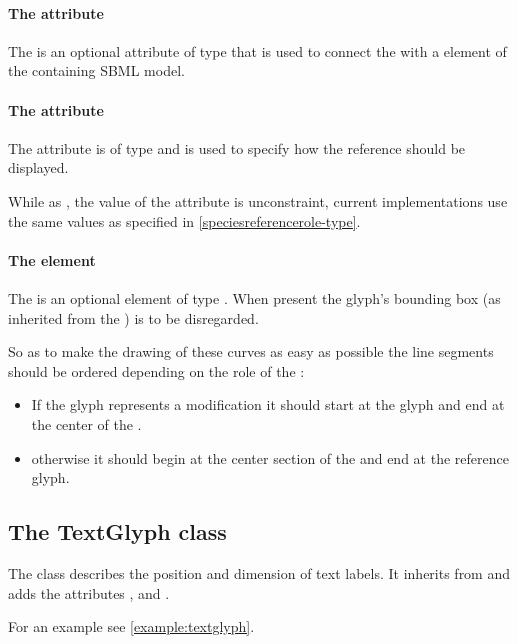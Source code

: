\paragraph{The  attribute}
The  is an optional attribute of type  
that is used to connect the \ReferenceGlyph with a element of the 
containing SBML model. 

\paragraph{The  attribute}
The  attribute is of type  and is used to 
specify how the reference should be displayed. 

While as , the value of the  attribute is 
unconstraint, current implementations use the same values as specified 
in \ref{speciesreferencerole-type}. 


\paragraph{The  element}
The  is an optional element of type \Curve. When present 
the glyph's bounding box (as inherited from the \GraphicalObject) is to 
be disregarded. 

So as to make the drawing of these curves as easy as possible the line 
segments should be ordered depending on the role of the \ReferenceGlyph:

\begin{itemize}
	\item If the glyph represents a modification it should start at the glyph and end at the center of the \GeneralGlyph.
	\item otherwise it should begin at the center section of the \GeneralGlyph and end at the reference glyph. 
\end{itemize}


\subsection{The TextGlyph class}
\label{textglyph-class}
The \TextGlyph class describes the position and dimension of text 
labels. It inherits from \GraphicalObject and adds the attributes 
,  and . 


For an example see \ref{example:textglyph}.

